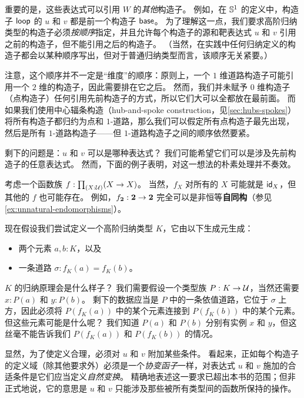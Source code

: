 重要的是，这些表达式可以引用 $W$ 的\emph{其他}构造子。
例如，在 $\Sn^1$ 的定义中，构造子 $\lloop$ 的 $u$ 和 $v$ 都是前一个构造子 $\base$。
为了理解这一点，我们要求高阶归纳类型的构造子必须\emph{按顺序}指定，并且允许每个构造子的源和靶表达式 $u$ 和 $v$ 引用之前的构造子，但不能引用之后的构造子。
（当然，在实践中任何归纳定义的构造子都会以某种顺序写出，但对于普通归纳类型而言，该顺序无关紧要。）

注意，这个顺序并不一定是``维度''的顺序：原则上，一个 $1$ 维道路构造子可能引用一个 $2$ 维的构造子，因此需要排在它之后。
然而，我们并未赋予 $0$ 维构造子（点构造子）任何引用先前构造子的方式，所以它们大可以全都放在最前面。
而如果我们使用中心辐条构造（hub-and-spoke construction，见\cref{sec:hubs-spokes}）将所有构造子都归约为点和 $1$-道路，那么我们可以假定所有点构造子最先出现，然后是所有 $1$-道路构造子——但 $1$-道路构造子之间的顺序依然要紧。

剩下的问题是：$u$ 和 $v$ 可以是哪种表达式？
我们可能希望它们可以是涉及先前构造子的任意表达式。
然而，下面的例子表明，对这一想法的朴素处理并不奏效。

\begin{eg}\label{eg:unnatural-hit}
  考虑一个函数族 $f:\prd{X:\type} (X\to X)$。
  当然，$f_X$ 对所有的 $X$ 可能就是 $\idfunc[X]$，但其他的 $f$ 也可能存在。
  例如，$f_{\bool}:\bool\to\bool$ 完全可以是非恒等{\bf 自同构}（参见 \cref{ex:unnatural-endomorphisms}）。

  现在假设我们尝试定义一个高阶归纳类型 $K$，它由以下生成元生成：
  \begin{itemize}
  \item 两个元素 $a,b:K$，以及
  \item 一条道路 $\sigma:f_K(a)=f_K(b)$。
  \end{itemize}
  $K$ 的归纳原理会是什么样子？
  我们需要假设一个类型族 $P:K\to\type$，当然还需要 $x:P(a)$ 和 $y:P(b)$。
  剩下的数据应当是 $P$ 中的一条依值道路，它位于 $\sigma$ 上方，因此必须将 $P(f_K(a))$ 中的某个元素连接到 $P(f_K(b))$ 中的某个元素。
  但这些元素可能是什么呢？
  我们知道 $P(a)$ 和 $P(b)$ 分别有实例 $x$ 和 $y$，但这丝毫不能告诉我们 $P(f_K(a))$ 和 $P(f_K(b))$ 的情况。
\end{eg}

显然，为了使定义合理，必须对 $u$ 和 $v$ 附加某些条件。
看起来，正如每个构造子的定义域（除其他要求外）必须是一个\emph{协变函子}一样，对表达式 $u$ 和 $v$ 施加的合适条件是它们应当定义\emph{自然变换}。
精确地表述这一要求已超出本书的范围；但非正式地说，它的意思是 $u$ 和 $v$ 只能涉及那些被所有类型间的函数所保持的操作。


